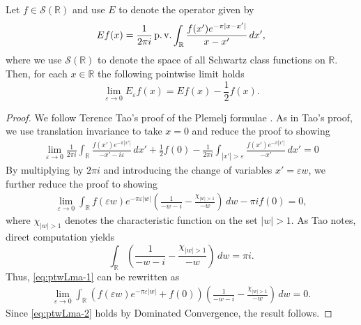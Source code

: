 \documentclass[../dissertation.tex]{subfiles}
\begin{document}
\begin{lma}
	\label{lma:ptwise-Lim} 
	Let $f \in \mathscr S(\mathbb R)$ and use $E$ to denote
	the operator given by
	\[
		Ef(x) =\frac{1}{2\pi i} \operatorname{p.v.} \int_{\mathbb R} \frac{f(x') e^{-\pi|x - x'|}}{x-x'}\,dx',
	\]
	where we use $\mathscr S(\mathbb R)$\label{sym3:schwartz} to denote the space of all Schwartz 
	class functions on $\mathbb R$.
	Then, for each $x \in \mathbb R$ the following pointwise limit holds
	\[
		\lim_{\varepsilon\to 0} E_\varepsilon f(x) = Ef(x) - \frac{1}{2} f(x).
	\]
\end{lma}
\begin{proof}
    We follow Terence Tao's proof of the Plemelj formulae \cite{Tao}. 
    As in Tao's proof, we use translation invariance to take $x = 0$ and reduce the proof 
    to showing
    \begin{align*} %
        \lim_{\varepsilon\to 0} \frac{1}{2\pi i} 
            \int_{\mathbb R} \frac{f(x') e^{-\pi|x'|}}{-x'-i\varepsilon}\,dx'    
            + \frac{1}{2} f(0) 
            - \frac{1}{2\pi i} \int_{|x'|>\varepsilon} \frac{f(x') e^{-\pi|x'|}}{-x'}\,dx' = 0
    \end{align*}
    By multiplying by $2 \pi i$ and introducing the change of variables $x' = \varepsilon w$, we
    further reduce the proof to showing
    \begin{align} \label{eq:ptwLma-1}
        \lim_{\varepsilon\to 0} \int_{\mathbb R} f(\varepsilon w) e^{-\pi\varepsilon|w|}
            \left( \frac{1}{-w-i}  - \frac{\chi_{|w| > 1}}{-w}\right)  \,dw
            - \pi i f(0) = 0,
    \end{align}
    where $\chi_{|w|>1}$ denotes the characteristic function on the set $|w|>1$.
    As Tao notes, direct computation yields
    \[
        \int_{\mathbb R} \left( \frac{1}{-w-i}  - \frac{\chi_{|w| > 1}}{-w}\right)  \,dw
            = \pi i.
    \]
    Thus, \eqref{eq:ptwLma-1} can be rewritten as
    \begin{align}\label{eq:ptwLma-2}
        \lim_{\varepsilon\to 0} 
        	\int_{\mathbb R} 
        		\left(
        			f(\varepsilon w) e^{-\pi \varepsilon|w|} + f(0)
        		\right)
            	\left( 
            		\frac{1}{-w-i}  - \frac{\chi_{|w| > 1}}{-w}
            	\right)  
            \,dw
             = 0.
    \end{align}
    Since \eqref{eq:ptwLma-2} holds by Dominated Convergence, the result follows.
\end{proof}
\end{document}
